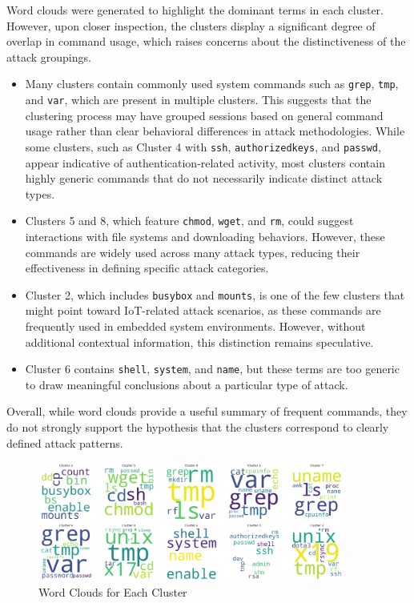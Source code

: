         Word clouds were generated to highlight the dominant terms in each cluster. However, upon closer inspection, the clusters display a significant degree of overlap in command usage, which raises concerns about the distinctiveness of the attack groupings.
        \begin{itemize}

            \item Many clusters contain commonly used system commands such as \texttt{grep}, \texttt{tmp}, and \texttt{var}, which are present in multiple clusters. This suggests that the clustering process may have grouped sessions based on general command usage rather than clear behavioral differences in attack methodologies. While some clusters, such as Cluster 4 with \texttt{ssh}, \texttt{authorizedkeys}, and \texttt{passwd}, appear indicative of authentication-related activity, most clusters contain highly generic commands that do not necessarily indicate distinct attack types.
            
            \item Clusters 5 and 8, which feature \texttt{chmod}, \texttt{wget}, and \texttt{rm}, could suggest interactions with file systems and downloading behaviors. However, these commands are widely used across many attack types, reducing their effectiveness in defining specific attack categories.
            
            \item Cluster 2, which includes \texttt{busybox} and \texttt{mounts}, is one of the few clusters that might point toward IoT-related attack scenarios, as these commands are frequently used in embedded system environments. However, without additional contextual information, this distinction remains speculative.
            
            \item Cluster 6 contains \texttt{shell}, \texttt{system}, and \texttt{name}, but these terms are too generic to draw meaningful conclusions about a particular type of attack.
            
        \end{itemize}
        Overall, while word clouds provide a useful summary of frequent commands, they do not strongly support the hypothesis that the clusters correspond to clearly defined attack patterns.
            
            \begin{figure}[H]
                \centering
                \includegraphics[width=0.9\textwidth]{../figures/plots/section3/circular_wordclouds.png}
                \caption{Word Clouds for Each Cluster}
                \label{fig:word_clouds}
            \end{figure}
            
